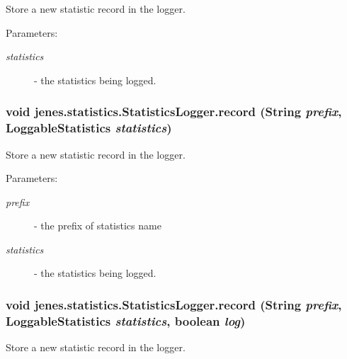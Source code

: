 Store a new statistic record in the logger.

\begin{Desc}
\item[Parameters:]
\begin{description}
\item[{\em statistics}]- the statistics being logged. \end{description}
\end{Desc}
\hypertarget{classjenes_1_1statistics_1_1_statistics_logger_31acd1617a14ed32519fc5487b30fd25}{
\subsubsection[record]{\setlength{\rightskip}{0pt plus 5cm}void jenes.statistics.StatisticsLogger.record (String {\em prefix}, \/  LoggableStatistics {\em statistics})}}
\label{classjenes_1_1statistics_1_1_statistics_logger_31acd1617a14ed32519fc5487b30fd25}


Store a new statistic record in the logger.

\begin{Desc}
\item[Parameters:]
\begin{description}
\item[{\em prefix}]- the prefix of statistics name \item[{\em statistics}]- the statistics being logged. \end{description}
\end{Desc}
\hypertarget{classjenes_1_1statistics_1_1_statistics_logger_1e68400e5e02df74005d654dd52a9b34}{
\subsubsection[record]{\setlength{\rightskip}{0pt plus 5cm}void jenes.statistics.StatisticsLogger.record (String {\em prefix}, \/  LoggableStatistics {\em statistics}, \/  boolean {\em log})}}
\label{classjenes_1_1statistics_1_1_statistics_logger_1e68400e5e02df74005d654dd52a9b34}


Store a new statistic record in the logger.

